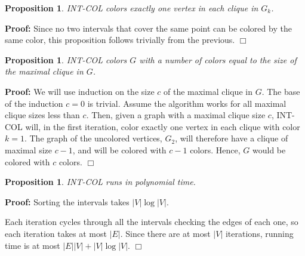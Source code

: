 \documentclass[11pt]{article} \usepackage{amssymb}
\newtheorem{proposition}[theorem]{Proposition}
\newenvironment{proof}{\noindent \textbf{Proof:}}{$\Box$}
\begin{document}
\begin{proposition}
  INT-COL colors exactly one vertex in each clique in $G_k$.
\end{proposition}
\begin{proof}
  Since no two intervals that cover the same point can be colored by the same
  color, this proposition follows trivially from the previous.
\end{proof}

\begin{proposition}
  INT-COL colors $G$ with a number of colors equal to the size of the maximal
  clique in $G$. 
\end{proposition}
\begin{proof}
  We will use induction on the size $c$ of the maximal clique in $G$. The base
  of the induction $c=0$ is trivial. Assume the algorithm works for all 
  maximal clique sizes less than $c$. Then, given a graph with a maximal clique
  size $c$, INT-COL will, in the first iteration, color exactly one vertex
  in each clique with color $k=1$. The graph of the uncolored vertices, $G_2$,
  will therefore have a clique of maximal size $c-1$, and will be colored with 
  $c-1$ colors. Hence, $G$ would be colored with $c$ colors.
\end{proof}

\begin{proposition}
  INT-COL runs in polynomial time.
\end{proposition}
\begin{proof}
  Sorting the intervals takes $|V|\log|V|$.

  Each iteration cycles through all the intervals checking the edges of each
  one, so each iteration takes at most $|E|$. 
  Since there are at most $|V|$ iterations, running time is at most 
  $|E||V|+|V|\log|V|$.
\end{proof}
\end{document}
